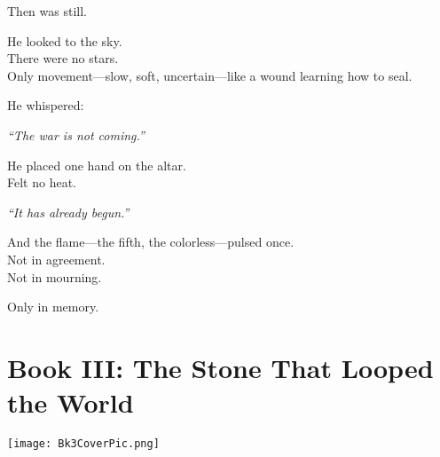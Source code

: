 \documentclass[12pt]{article}
\begin{document}
\vspace{0.5em}
Then was still.

\vspace{0.5em}
He looked to the sky.\\
There were no stars.\\
Only movement---slow, soft, uncertain---like a wound learning how to seal.

\vspace{0.5em}
He whispered:

\vspace{0.5em}
\textit{``The war is not coming.''}

\vspace{0.5em}
He placed one hand on the altar.\\
Felt no heat.

\vspace{0.5em}
\textit{``It has already begun.''}

\vspace{0.5em}
And the flame---the fifth, the colorless---pulsed once.\\
Not in agreement.\\
Not in mourning.

\vspace{0.5em}
Only in memory.


\newpage

\section*{Book III: The Stone That Looped the World} 

\vspace{1in}

\begin{center}
    \texttt{[image: Bk3CoverPic.png]}
\end{center}

\vspace{1in}
\end{document}
